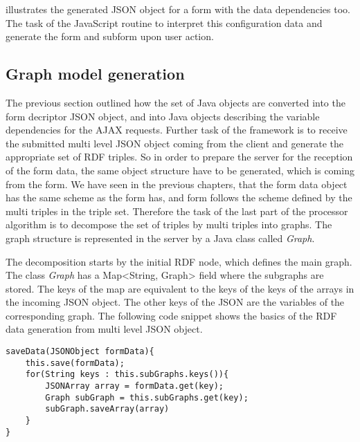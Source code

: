  illustrates the generated JSON object for a form with the data dependencies too. The task of the JavaScript routine to interpret this configuration data and generate the form and subform upon user action.


\subsection{Graph model generation}  \label{513}


The previous section outlined how the set of Java objects are converted into the form decriptor JSON object, and into Java objects describing the variable dependencies for the AJAX requests. Further task of the framework is to receive the submitted multi level JSON object coming from the client and generate the appropriate set of RDF triples. So in order to prepare the server for the reception of the form data, the same object structure have to be generated, which is coming from the form. We have seen in the previous chapters, that the form data object has the same scheme as the form has, and form follows the scheme defined by the multi triples in the triple set. Therefore the task of the last part of the processor algorithm is to decompose the set of triples by multi triples into graphs. The graph structure is represented in the server by a Java class called \textit{Graph}. 


The decomposition starts by the initial RDF node, which defines the main graph. The class \textit{Graph} has a Map<String, Graph> field where the subgraphs are stored. The keys of the map are equivalent to the keys of the keys of the arrays in the incoming JSON object. The other keys of the JSON are the variables of the corresponding graph. The following code snippet shows the basics of the RDF data generation from multi level JSON object. 

\begin{lstlisting}[basicstyle=\footnotesize, frame=single, caption={Subform descriptor}, label=dataGeneration captionpos=b, belowskip=1em, aboveskip=2em]
saveData(JSONObject formData){
	this.save(formData);
	for(String keys : this.subGraphs.keys()){
		JSONArray array = formData.get(key);
		Graph subGraph = this.subGraphs.get(key);
		subGraph.saveArray(array)					
	}
}
\end{lstlisting}

